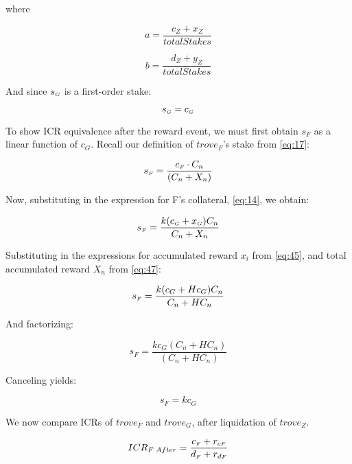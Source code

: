 \documentclass[reqno]{article}
\begin{document}
\bigskip
where

\begin{equation} 
    a=\frac{c_Z+x_Z}{totalStakes}
\end{equation}

\begin{equation} 
    b=\frac{d_Z+y_Z}{totalStakes}
\end{equation}

\bigskip
And since $s_\mathsmaller{G}$ is a first-order stake:

\begin{equation} \label{eq:21}
    s_\mathsmaller{G}=c_\mathsmaller{G}
\end{equation}

\bigskip
To show ICR equivalence after the reward event, we must first obtain $s_F$ as a linear function of $c_G$. Recall our definition of $trove_F$’s stake from \ref{eq:17}:

\begin{equation} 
    s_\mathsmaller{F}=\frac{c_\mathsmaller{F} \cdot C_n}{(C_n+X_n)}
\end{equation}

\bigskip
Now, substituting in the expression for F’s collateral, \ref{eq:14}, we obtain:

\begin{equation} 
    s_\mathsmaller{F}=\frac{k(c_\mathsmaller{G}+x_\mathsmaller{G})C_n}{C_n+X_n}
\end{equation}


\bigskip
Substituting in the expressions for accumulated reward $x_i$ from \ref{eq:45}, and total accumulated reward $X_n$ from \ref{eq:47}:

\begin{equation} 
    s_\mathsmaller{F}=\frac{k(c_G+Hc_G)C_n}{C_n+HC_n}
\end{equation}

\bigskip
And factorizing:

\begin{equation} 
    s_F=\frac{kc_G(C_n+HC_n)}{(C_n+HC_n)}
\end{equation}

\bigskip
Canceling yields:

\begin{equation} \label{eq:29}
    s_F=kc_G
\end{equation}

\bigskip
We now compare ICRs of $trove_F$ and $trove_G$, after liquidation of $trove_Z$.

\begin{equation} 
    ICR_{F \; After}=\frac{c_\mathsmaller{F}+r_{c\mathsmaller{F}}}{d_\mathsmaller{F}+r_{d\mathsmaller{F}}}
\end{equation}
\end{document}
